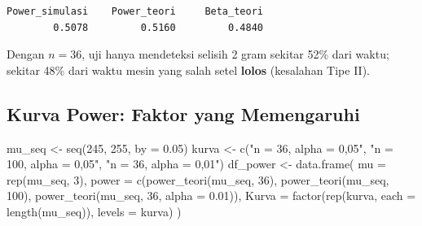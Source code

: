 \documentclass[
  indonesian,
  letterpaper,
]{book}
\newenvironment{Shaded}{\begin{snugshade}}{\end{snugshade}}
\newcommand{\AttributeTok}[1]{\textcolor[rgb]{0.40,0.45,0.13}{#1}}
\newcommand{\DecValTok}[1]{\textcolor[rgb]{0.68,0.00,0.00}{#1}}
\newcommand{\FloatTok}[1]{\textcolor[rgb]{0.68,0.00,0.00}{#1}}
\newcommand{\FunctionTok}[1]{\textcolor[rgb]{0.28,0.35,0.67}{#1}}
\newcommand{\NormalTok}[1]{\textcolor[rgb]{0.00,0.23,0.31}{#1}}
\newcommand{\OtherTok}[1]{\textcolor[rgb]{0.00,0.23,0.31}{#1}}
\newcommand{\StringTok}[1]{\textcolor[rgb]{0.13,0.47,0.30}{#1}}
\begin{document}
\begin{verbatim}
Power_simulasi    Power_teori     Beta_teori 
        0.5078         0.5160         0.4840 
\end{verbatim}

Dengan \(n = 36\), uji hanya mendeteksi selisih 2 gram sekitar 52\% dari
waktu; sekitar 48\% dari waktu mesin yang salah setel \textbf{lolos}
(kesalahan Tipe II).

\subsection{Kurva Power: Faktor yang
Memengaruhi}\label{kurva-power-faktor-yang-memengaruhi}

\begin{Shaded}
\begin{Highlighting}[]
\NormalTok{mu\_seq }\OtherTok{\textless{}{-}} \FunctionTok{seq}\NormalTok{(}\DecValTok{245}\NormalTok{, }\DecValTok{255}\NormalTok{, }\AttributeTok{by =} \FloatTok{0.05}\NormalTok{)}
\NormalTok{kurva  }\OtherTok{\textless{}{-}} \FunctionTok{c}\NormalTok{(}\StringTok{"n = 36, alpha = 0,05"}\NormalTok{, }\StringTok{"n = 100, alpha = 0,05"}\NormalTok{, }\StringTok{"n = 36, alpha = 0,01"}\NormalTok{)}
\NormalTok{df\_power }\OtherTok{\textless{}{-}} \FunctionTok{data.frame}\NormalTok{(}
  \AttributeTok{mu    =} \FunctionTok{rep}\NormalTok{(mu\_seq, }\DecValTok{3}\NormalTok{),}
  \AttributeTok{power =} \FunctionTok{c}\NormalTok{(}\FunctionTok{power\_teori}\NormalTok{(mu\_seq, }\DecValTok{36}\NormalTok{), }\FunctionTok{power\_teori}\NormalTok{(mu\_seq, }\DecValTok{100}\NormalTok{),}
            \FunctionTok{power\_teori}\NormalTok{(mu\_seq, }\DecValTok{36}\NormalTok{, }\AttributeTok{alpha =} \FloatTok{0.01}\NormalTok{)),}
  \AttributeTok{Kurva =} \FunctionTok{factor}\NormalTok{(}\FunctionTok{rep}\NormalTok{(kurva, }\AttributeTok{each =} \FunctionTok{length}\NormalTok{(mu\_seq)), }\AttributeTok{levels =}\NormalTok{ kurva)}
\NormalTok{)}


\end{Highlighting}
\end{Shaded}
\end{document}

